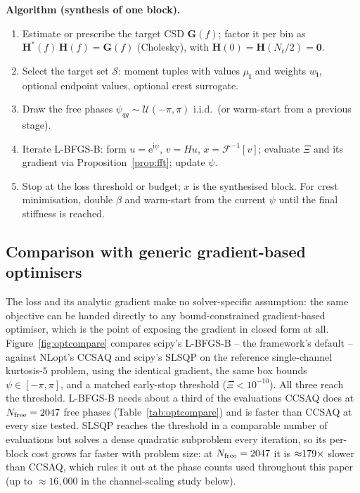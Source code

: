 \documentclass[10pt,a4paper]{article}
\numberwithin{equation}{section}
\newcommand{\block}[1]{\left[#1\right]}
\newcommand{\mat}[1]{\left(#1\right)}
\newcommand{\m}[1]{\mathrm{#1}}
\begin{document}
\textbf{Algorithm (synthesis of one block).}
\begin{enumerate}
\item Estimate or prescribe the target CSD $\mathbf{G}\mat{f}$; factor it per bin as $\mathbf{H}^*\mat{f}\,\mathbf{H}\mat{f} = \mathbf{G}\mat{f}$ (Cholesky), with $\mathbf{H}\mat{0} = \mathbf{H}\mat{N_t/2} = \mathbf{0}$.
\item Select the target set $\mathcal{S}$: moment tuples with values $\mu_\mathbf{i}$ and weights $w_\mathbf{i}$, optional endpoint values, optional crest surrogate.
\item Draw the free phases $\psi_{q g} \sim \mathcal{U}\mat{-\pi, \pi}$ i.i.d.\ (or warm-start from a previous stage).
\item Iterate L-BFGS-B: form $u = \m{e}^{\m{i}\psi}$, $v = H u$, $x = \mathcal{F}^{-1}\block{v}$; evaluate $\Xi$ and its gradient via Proposition~\ref{prop:fft}; update $\psi$.
\item Stop at the loss threshold or budget; $x$ is the synthesised block. For crest minimisation, double $\beta$ and warm-start from the current $\psi$ until the final stiffness is reached.
\end{enumerate}

\subsection*{Comparison with generic gradient-based optimisers}
The loss and its analytic gradient make no solver-specific assumption: the same objective can be handed directly to any bound-constrained gradient-based optimiser, which is the point of exposing the gradient in closed form at all. Figure~\ref{fig:optcompare} compares scipy's L-BFGS-B -- the framework's default -- against NLopt's CCSAQ and scipy's SLSQP on the reference single-channel kurtosis-$5$ problem, using the identical gradient, the same box bounds $\psi\in[-\pi,\pi]$, and a matched early-stop threshold ($\Xi < 10^{-10}$). All three reach the threshold. L-BFGS-B needs about a third of the evaluations CCSAQ does at $N_{\rm free}=2047$ free phases (Table~\ref{tab:optcompare}) and is faster than CCSAQ at every size tested. SLSQP reaches the threshold in a comparable number of evaluations but solves a dense quadratic subproblem every iteration, so its per-block cost grows far faster with problem size: at $N_{\rm free}=2047$ it is ${\approx}179\times$ slower than CCSAQ, which rules it out at the phase counts used throughout this paper (up to ${\approx}16{,}000$ in the channel-scaling study below).
\end{document}
